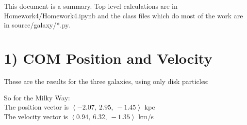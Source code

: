 

\setlength{\parskip}{0.2em}
\setlength{\skip\footins}{20pt}

\newcommand{\hmwkClass}{ASTR 400B}
\newcommand{\hmwkTitle}{Homework 4}
\newcommand{\hmwkDueDate}{Feb 13, 2020}



	
\maketitle

This document is a summary. Top-level calculations are in Homework4/Homework4.ipynb and the class files which do most of the work are in source/galaxy/*.py.

\section*{1) COM Position and Velocity}

These are the results for the three galaxies, using only disk particles:\\

{ \par}\vspace{5mm}

So for the Milky Way: \\
The position vector is $\left< -2.07,\ 2.95,\ -1.45\right>$ kpc\\
The velocity vector is $\left<0.94,\ 6.32,\ -1.35 \right>$ km/s

